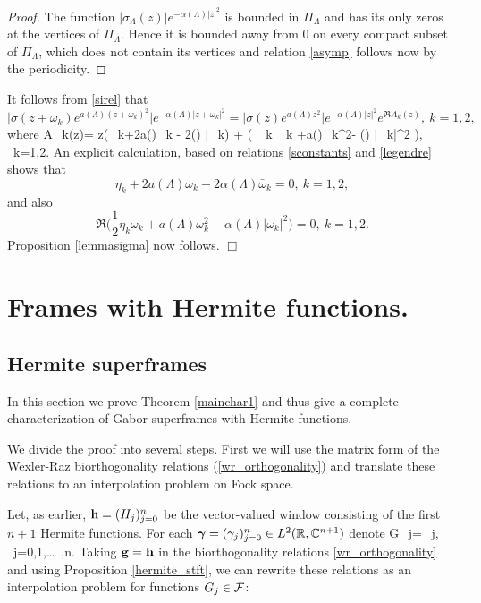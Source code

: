 \documentclass[12pt]{amsart}
\begin{document}
\begin{proof}  The function 
$|\sigma_\Lambda(z)|e^{-\alpha(\Lambda) |z|^2}$ is bounded in 
$\Pi_\Lambda$ and has its only zeros at the vertices of $\Pi _\Lambda
$. Hence it is bounded away from $0$ on every compact subset of $\Pi
_\Lambda$,  which does not contain its vertices 
and relation \eqref{asymp}  follows now by the
periodicity. 
\end{proof}
\medskip 
 

 It follows from \eqref{sirel} that
\[
\Big |  \sigma(z+\omega_k) e^{a(\Lambda)(z+\omega_k)^2}   \Big |
e^{-\alpha(\Lambda)|z+\omega_k|^2}=
\Big |  \sigma(z) e^{a(\Lambda)z^2}\Big |e^{-\alpha(\Lambda) |z|^2} e^{\Re A_k(z)}, \ k=1,2,
\]
where 
 \beq
\label{ak}
A_k(z)=  z\Big (\eta_k+2a(\Lambda)\omega_k -  
          2\alpha(\Lambda) \bar{\omega}_k\Big )  +
                 \Big (  \eta_k \omega_k  +a(\Lambda)\omega_k^2-
                                    \alpha(\Lambda) |\omega_k|^2 \Big ),   \ k=1,2.
\eeq
An explicit calculation, based on relations \eqref{sconstants}  and \eqref{legendre}
shows that 
\[
\eta_k+2a(\Lambda)\omega_k -  2\alpha(\Lambda) \bar{\omega}_k= 0, \ k=1,2,
\]
and also
\[
\Re \Big (\frac 12 \eta_k \omega_k  +a(\Lambda)\omega_k^2-
        \alpha(\Lambda) |\omega_k|^2\Big )= 0, \
k=1,2.
\] 
Proposition \ref{lemmasigma} now follows.
\hfill $\Box$

\bigskip


\section{Frames with Hermite functions.}

\subsection{Hermite superframes}


In this section we prove  Theorem  \ref{mainchar1}   and thus give a complete
characterization of Gabor superframes with Hermite functions. 
 

We divide the proof into several steps. 
First  we will use the matrix form of the Wexler-Raz  biorthogonality relations
  (\ref{wr_orthogonality}) and  translate these relations  to
  an interpolation problem on  Fock space. 


Let, as earlier,  $\mathbf {h}=(H_j)_{j=0}^n$ be the vector-valued window consisting  of the
first $n+1$ Hermite functions.  
  For each  
$\boldsymbol{\gamma}=(\gamma_j)_{j=0}^n\in L^2(\mathbb{R},\mathbb{C} ^{n+1})$ denote
\label{dual_gamma}
\beq G_j=\cB\gamma_j,  \ j=0,1,\ldots \ ,n.
\eeq
Taking $\mathbf {g}=\mathbf {h}$ in the biorthogonality relations
\eqref{wr_orthogonality} and using 
Proposition \ref{hermite_stft},   we can rewrite these relations as an
interpolation problem  for functions $G_j\in \mathcal{F}$:
\end{document}

